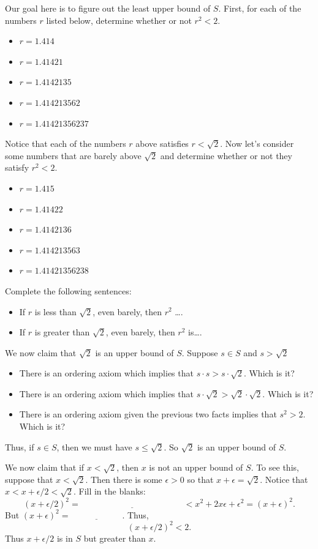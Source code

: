 \documentclass[11pt]{article}
\newenvironment{task}
	{\begin{mdframed}[linecolor=lightgray, linewidth=3pt]\raggedright}
	{\end{mdframed}}
\theoremstyle{definition}
\begin{document}
\begin{task}
  Our goal here is to figure out the least upper bound of $S$. First, for each of the numbers $r$ listed below, determine whether or not
  $r^2 < 2$.
  \begin{itemize}
    \item $r=1.414$
    \item $r=1.41421$
    \item $r=1.4142135$
    \item $r=1.414213562$
    \item $r=1.41421356237$
  \end{itemize}
  Notice that each of the numbers $r$ above satisfies $r < \sqrt{2}$. Now let's consider some numbers that are barely above $\sqrt{2}$ and
  determine whether or not they satisfy $r^2 < 2$.
  \begin{itemize}
    \item $r=1.415$
    \item $r=1.41422$
    \item $r=1.4142136$
    \item $r=1.414213563$
    \item $r=1.41421356238$
  \end{itemize}
  Complete the following sentences:
  \begin{itemize}
    \item If $r$  is less than $\sqrt{2}$, even barely, then $r^2$ \dots.
    \item If $r$  is greater than $\sqrt{2}$, even barely, then $r^2$ is\dots.
  \end{itemize}
  We now claim that $\sqrt{2}$ is an upper bound of $S$. Suppose $s\in S$ and $s > \sqrt{2}$
  \begin{itemize}
    \item There is an ordering axiom which implies that $s\cdot s > s\cdot \sqrt{2}$. Which is it?
    \item There is an ordering axiom which implies that $s\cdot \sqrt{2} > \sqrt{2}\cdot \sqrt{2}$. Which is it?
    \item There is an ordering axiom given the previous two facts implies that $s^2 > 2$. Which is it?
  \end{itemize}
  Thus, if $s\in S$, then we must have $s\leq \sqrt{2}$. So $\sqrt{2}$ is an upper bound of $S$. 
  
  We now claim that
  if $x < \sqrt{2}$, then $x$ is not an upper bound of $S$. To see this, suppose that $x < \sqrt{2}$. Then there is
  some $\epsilon > 0$ so that $x+\epsilon = \sqrt{2}$. Notice that $x < x + \epsilon/2 < \sqrt{2}$. Fill in the blanks:
  \[ (x + \epsilon/2)^2 = \underline{\hspace{2in}} < x^2 + 2x\epsilon + \epsilon^2 = (x+\epsilon)^2. \]
  But $(x+\epsilon)^2 = \underline{\hspace{1in}}$. Thus,
  \[ (x+\epsilon/2)^2 < 2. \]
  Thus $x+\epsilon/2$ is in $S$ but greater than $x$. 
  

\end{task}
\end{document}
